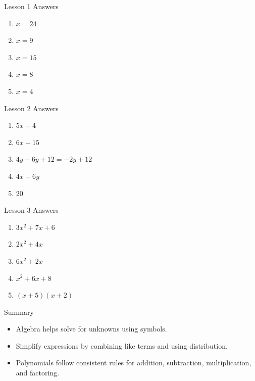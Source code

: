 \documentclass{beamer}
\begin{document}
\begin{frame}{Lesson 1 Answers}
\begin{enumerate}
    \item $x = 24$
    \item $x = 9$
    \item $x = 15$
    \item $x = 8$
    \item $x = 4$
\end{enumerate}
\end{frame}

\begin{frame}{Lesson 2 Answers}
\begin{enumerate}
    \item $5x + 4$
    \item $6x + 15$
    \item $4y - 6y + 12 = -2y + 12$
    \item $4x + 6y$
    \item $20$
\end{enumerate}
\end{frame}

\begin{frame}{Lesson 3 Answers}
\begin{enumerate}
    \item $3x^2 + 7x + 6$
    \item $2x^2 + 4x$
    \item $6x^2 + 2x$
    \item $x^2 + 6x + 8$
    \item $(x + 5)(x + 2)$
\end{enumerate}
\end{frame}

\begin{frame}{Summary}
\begin{itemize}
    \item Algebra helps solve for unknowns using symbols.
    \item Simplify expressions by combining like terms and using distribution.
    \item Polynomials follow consistent rules for addition, subtraction, multiplication, and factoring.
\end{itemize}
\end{frame}
\end{document}
